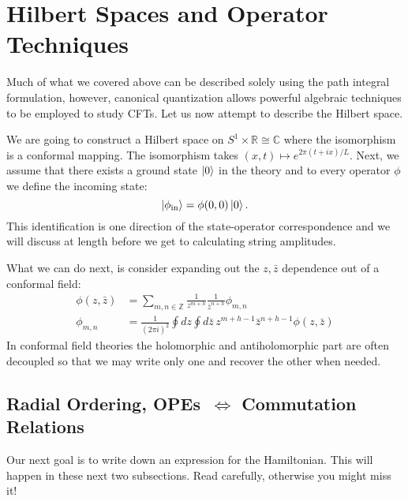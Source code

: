 \documentclass{report}
\theoremstyle{plain}
\theoremstyle{definition}
\theoremstyle{remark}
\newcommand{\FR}[2]{\frac{#1}{#2}}
\newcommand{\bC}{\mathbb{C}}
\newcommand{\bR}{\mathbb{R}}
\newcommand{\bZ}{\mathbb{Z}}
\begin{document}
\section{Hilbert Spaces and Operator Techniques}

Much of what we covered above can be described solely using the path
integral formulation, however, canonical quantization allows powerful
algebraic techniques to be employed to study CFTs. Let us now attempt to
describe the Hilbert space.

We are going to construct a Hilbert space on $S^1\times\bR \cong \bC$ where
the isomorphism is a conformal mapping. The isomorphism takes $(x,t)
\mapsto e^{2\pi(t+ix)/L}$. Next, we assume that there exists a ground state
$\ket 0$ in the theory and to every operator $\phi$ we define the incoming
state: \[\ket{\phi_{\text{in}}} = \phi(0,0)\ket 0.\] This identification is
one direction of the state-operator correspondence and we will discuss at
length before we get to calculating string amplitudes. 

What we can do next, is consider expanding out the $z,\bar z$ dependence
out of a conformal field:
\begin{align*}
\phi(z,\bar z) &=\sum_{m,n\in\bZ}\FR{1}{z^{m+h}}\FR{1}{\bar z^{n+h}}\phi_{m,n}\\
\phi_{m,n} &= \FR{1}{(2\pi i)^2} \oint dz \oint d\bar z\, z^{m+h-1} \bar
z^{n+h-1} \phi(z,\bar z)
\end{align*}
In conformal field theories the holomorphic and antiholomorphic part are
often decoupled so that we may write only one and recover the other when
needed.

\subsection{Radial Ordering, OPEs \,$\Leftrightarrow$ Commutation Relations}
Our next goal is to write down an expression for the Hamiltonian. This will
happen in these next two subsections. Read carefully, otherwise you might
miss it! 
\end{document}

